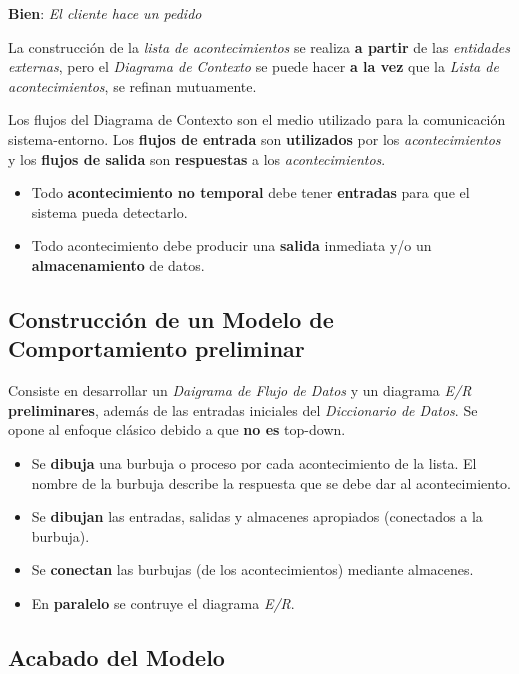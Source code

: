 \textbf{Bien}: \textit{El cliente hace un pedido}

La construcción de la \textit{lista de acontecimientos} se realiza \textbf{a partir} de las \textit{entidades externas}, pero el \textit{Diagrama de Contexto} se puede hacer \textbf{a la vez} que la \textit{Lista de acontecimientos}, se refinan mutuamente.

Los flujos del Diagrama de Contexto son el medio utilizado para la comunicación sistema-entorno. Los \textbf{flujos de entrada} son \textbf{utilizados} por los \textit{acontecimientos} y los \textbf{flujos de salida} son \textbf{respuestas} a los \textit{acontecimientos}.

\begin{itemize}[noitemsep]
\item Todo \textbf{acontecimiento no temporal} debe tener \textbf{entradas} para que el sistema pueda detectarlo.
\item Todo acontecimiento debe producir una \textbf{salida} inmediata y/o un \textbf{almacenamiento} de datos.
\end{itemize}


\subsection{Construcción de un Modelo de Comportamiento preliminar} %

Consiste en desarrollar un \textit{Daigrama de Flujo de Datos} y un diagrama \textit{E/R} \textbf{preliminares}, además de las entradas iniciales del \textit{Diccionario de Datos}. Se opone al enfoque clásico debido a que \textbf{no es} top-down.

\begin{itemize}[noitemsep]
\item Se \textbf{dibuja} una burbuja o proceso por cada acontecimiento de la lista. El nombre de la burbuja describe la respuesta que se debe dar al acontecimiento.
\item Se \textbf{dibujan} las entradas, salidas y almacenes apropiados (conectados a la burbuja).
\item Se \textbf{conectan} las burbujas (de los acontecimientos) mediante almacenes.
\item En \textbf{paralelo} se contruye el diagrama \textit{E/R}.
\end{itemize}


\subsection{Acabado del Modelo}

